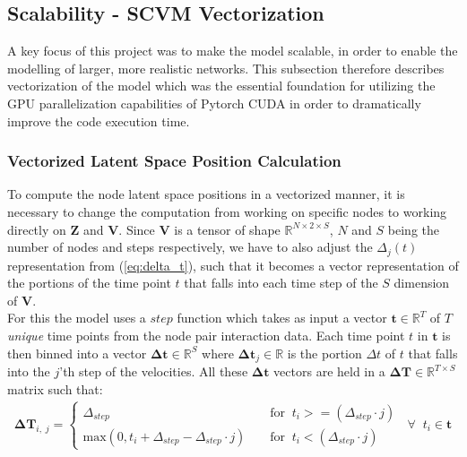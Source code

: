 \subsection{Scalability - SCVM Vectorization}
\label{sec:Method:Scalability}
A key focus of this project was to make the model scalable, in order to enable the modelling of larger, more realistic networks.
This subsection therefore describes vectorization of the model which was the essential foundation for utilizing the GPU parallelization capabilities of Pytorch CUDA\cite{CUDADocumentation} in order to dramatically improve the code execution time.

\subsubsection{Vectorized Latent Space Position Calculation}
\label{sec:Method:LatentSpacePositionCalculation}
To compute the node latent space positions in a vectorized manner, it is necessary to change the computation from working on specific nodes to working directly on $\textbf{Z}$ and $\textbf{V}$. Since $\textbf{V}$ is a tensor of shape $\mathbb{R}^{N \times 2 \times S}$, $N$ and $S$ being the number of nodes and steps respectively, we have to also adjust the $\Delta_j(t)$ representation from (\ref{eq:delta_t}), such that it becomes a vector representation of the portions of the time point $t$ that falls into each time step of the $S$ dimension of $\textbf{V}$.
\\
For this the model uses a $step$ function which takes as input a vector $\textbf{t} \in \mathbb{R}^{T}$ of $T$ \textit{unique} time points from the node pair interaction data. Each time point $t$ in $\textbf{t}$ is then binned into a vector $\boldsymbol{\Delta}\textbf{t} \in \mathbb{R}^{S}$ where $\boldsymbol{\Delta}\textbf{t}_j \in \mathbb{R}$ is the portion $\Delta t$ of $t$ that falls into the $j$'th step of the velocities. All these $\boldsymbol{\Delta}\textbf{t}$ vectors are held in a $\boldsymbol{\Delta}\textbf{T} \in \mathbb{R}^{T \times S}$ matrix such that:
\begin{align}
    \boldsymbol{\Delta}\textbf{T}_{i,\;j} =
    \begin{cases}
        \Delta_{step} \;\; &\text{for} \;\; t_i >= (\Delta_{step} \cdot j) \\
        \text{max}(0, t_i + \Delta_{step} - \Delta_{step} \cdot j) \;\; \;\; &\text{for} \;\; t_i < (\Delta_{step} \cdot j)
    \end{cases}
    \;\; \forall \;\; t_i \in \textbf{t}
\end{align}
